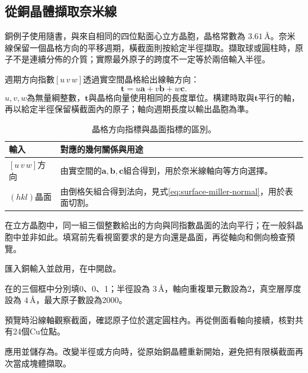 \FloatBarrier
\subsection{從銅晶體擷取奈米線}

銅例子使用隨書，與來自相同的四位點面心立方晶胞，晶格常數為 $3.61\,\text{\AA}$。奈米線保留一個晶格方向的平移週期，橫截面則按給定半徑擷取。擷取球或圓柱時，原子不是連續分佈的介質；實際最外原子的跨度不一定等於兩倍輸入半徑。

週期方向指數$[u\,v\,w]$透過實空間晶格給出線軸方向：
\begin{equation}
  \mathbf t=u\mathbf a+v\mathbf b+w\mathbf c.
  \label{eq:nanowire-lattice-direction}
\end{equation}
$u,v,w$為無量綱整數，$\mathbf t$與晶格向量使用相同的長度單位。構建時取與$\mathbf t$平行的軸，再以給定半徑保留橫截面內的原子；軸向週期長度以輸出晶胞為準。

\begin{table}[htbp]
\centering
\caption{晶格方向指標與晶面指標的區別。}
\begin{tabularx}{\linewidth}{lX}
\toprule
輸入 & 對應的幾何關係與用途\\
\midrule
$[u\,v\,w]$方向 & 由實空間的$\mathbf a,\mathbf b,\mathbf c$組合得到，用於奈米線軸向等方向選擇。\\
$(hkl)$晶面 & 由倒格矢組合得到法向，見式\eqref{eq:surface-miller-normal}，用於表面切割。\\
\bottomrule
\end{tabularx}
\end{table}

在立方晶胞中，同一組三個整數給出的方向與同指數晶面的法向平行；在一般斜晶胞中並非如此。填寫前先看視窗要求的是方向還是晶面，再從軸向和側向檢查預覽。

\begin{steps}
  \item 匯入銅輸入並啟用，在中開啟。
  \item 在的三個框中分別填0、0、1；半徑設為 $3\,\text{\AA}$，軸向重複單元數設為2，真空層厚度設為 $4\,\text{\AA}$，最大原子數設為2000。
  \item 預覽時沿線軸觀察截面，確認原子位於選定圓柱內。再從側面看軸向接續，核對共有24個Cu位點。
  \item 應用並儲存為。改變半徑或方向時，從原始銅晶體重新開始，避免把有限橫截面再次當成塊體擷取。
\end{steps}

